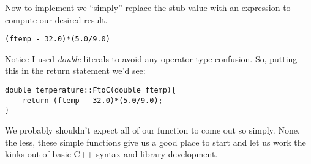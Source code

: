 \documentclass[]{tufte-handout}
\begin{document}
Now to implement we ``simply'' replace the stub value with an expression to compute our desired result.
\begin{verbatim}
(ftemp - 32.0)*(5.0/9.0)
\end{verbatim}
Notice I used \textit{double} literals to avoid any operator type confusion. So, putting this in the return statement we'd see:
\begin{verbatim}
double temperature::FtoC(double ftemp){
	return (ftemp - 32.0)*(5.0/9.0);
}
\end{verbatim}

We probably shouldn't expect all of our function to come out so simply. None, the less, these simple functions give us a good place to start and let us work the kinks out of basic C++ syntax and library development.
\end{document}
